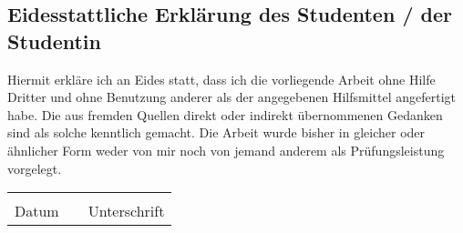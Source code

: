 \documentclass[12pt]{article}
\begin{document}
\pagestyle{fancy} %
\fancyhf{} %

\vspace*{1.5em}

\subsection*{Eidesstattliche Erklärung des Studenten / der Studentin}

Hiermit erkläre ich an Eides statt, dass ich die vorliegende Arbeit ohne Hilfe Dritter und ohne
Benutzung anderer als der angegebenen Hilfsmittel angefertigt habe. Die aus fremden
Quellen direkt oder indirekt übernommenen Gedanken sind als solche kenntlich gemacht.
Die Arbeit wurde bisher in gleicher oder ähnlicher Form weder von mir noch von jemand
anderem als Prüfungsleistung vorgelegt.

\vspace{3em}

\renewcommand{\arraystretch}{1.5} %

\begin{tabular}
    {
        m{}
        m{}
        m{}
    }
          &  &              \\ \cline{1-1} \cline{3-3}
    Datum &  & Unterschrift \\
\end{tabular}
\end{document}
